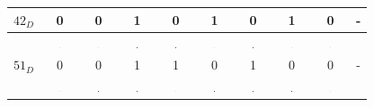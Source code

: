 \documentclass[10pt,a4paper,boxed]{hmcpset}
\begin{document}
\begin{table}[h!]
\begin{tabular}{|c|c|c|c|c|c|c|c|c|c|}
		 $42_D$ & 0 & 0 & 1 & 0 & 1 & 0 & 1 & 0 & - \\  
		\hline  & \includegraphics[width=0.03\textwidth]{img/0.pdf} & \includegraphics[width=0.03\textwidth]{img/0.pdf} & \includegraphics[width=0.03\textwidth]{img/1.pdf} & \includegraphics[width=0.03\textwidth]{img/1.pdf} & \includegraphics[width=0.03\textwidth]{img/0.pdf} & \includegraphics[width=0.03\textwidth]{img/1.pdf} & \includegraphics[width=0.03\textwidth]{img/0.pdf} & \includegraphics[width=0.03\textwidth]{img/0.pdf} &  \\ 
		 $51_D$ & 0 & 0 & 1 & 1 & 0 & 1 & 0 & 0 & - \\  
		\hline  & \includegraphics[width=0.03\textwidth]{img/0.pdf} & \includegraphics[width=0.03\textwidth]{img/1.pdf} & \includegraphics[width=0.03\textwidth]{img/1.pdf} & \includegraphics[width=0.03\textwidth]{img/0.pdf} & \includegraphics[width=0.03\textwidth]{img/1.pdf} & \includegraphics[width=0.03\textwidth]{img/1.pdf} & \includegraphics[width=0.03\textwidth]{img/1.pdf} & \includegraphics[width=0.03\textwidth]{img/0.pdf} &  \\ 

\end{tabular}
\end{table}
\end{document}
